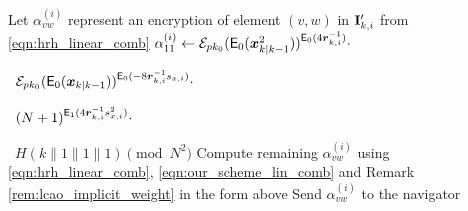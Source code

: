 \documentclass[10pt,journal,compsoc]{IEEEtran}
\theoremstyle{definition}
\theoremstyle{definition}
\theoremstyle{remark}
\begin{document}
\begin{algorithm}[htbp]
\begin{algorithmic}[1]
    \State Let $\alpha_{vw}^{(i)}$ represent an encryption of element $(v,w)$ in ${{\mathbf{I}}}'_{k,i}$ from \eqref{eqn:hrh_linear_comb}
    \State $\alpha_{11}^{(i)} \gets \mathcal{E}_{pk_0}(\mathsf{E}_{0}({\boldsymbol{x}}^2_{k|k-1}))^{\mathsf{E}_{0}(4{\boldsymbol{r}}_{k, i}^{-1})}\cdot$\par
    \ $\mathcal{E}_{pk_0}(\mathsf{E}_{0}({\boldsymbol{x}}_{k|k-1}))^{\mathsf{E}_{0}(-8{\boldsymbol{r}}_{k, i}^{-1}s_{x,i})}\cdot$\par
    \ $(N+1)^{\mathsf{E}_{1}(4{\boldsymbol{r}}_{k, i}^{-1}s_{x,i}^2)}\cdot$\par
    \ $H(k\mathbin\|1\mathbin\|1\mathbin\|1)\pmod{N^2}$
    \State Compute remaining $\alpha_{vw}^{(i)}$ using \eqref{eqn:hrh_linear_comb}, \eqref{eqn:our_scheme_lin_comb} and Remark \ref{rem:lcao_implicit_weight} in the form above
            \State Send $\alpha_{vw}^{(i)}$ to the navigator
        \EndFor
    \EndFor
    \EndProcedure
\end{algorithmic}
\end{algorithm}
\end{document}
